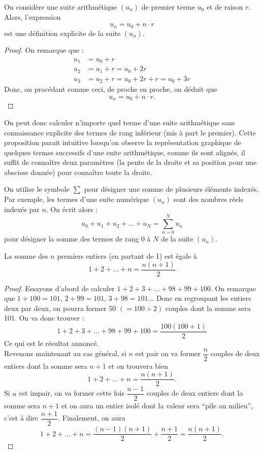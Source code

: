 \documentclass[a4paper, 12pt]{report}
\begin{document}
\begin{thm}
On considère une suite arithmétique $(u_n)$ de premier terme $u_0$ et de raison $r$. Alors, l'expression 
\[ u_n = u_0 + n \cdot r \]
est une définition explicite de la suite $(u_n)$.
\end{thm}

\begin{proof}
On remarque que :
\begin{align*}
u_1 & = u_0 + r \\
u_2 & = u_1 + r = u_0 + 2r  \\
u_3 & = u_2 + r = u_0 + 2r + r = u_0 + 3r 
\end{align*}
Donc, on procédant comme ceci, de proche en proche, on déduit que 
\[ u_n = u_0 + n \cdot r . \]
\end{proof}

\begin{rmq} On peut donc calculer n'importe quel terme d'une suite arithmétique sans connaissance explicite des termes de rang inférieur (mis à part le premier). Cette proposition parait intuitive lorsqu'on observe la représentation graphique de quelques termes successifs d'une suite arithmétique, comme ils sont alignés, il suffit de connaître deux paramètres (la pente de la droite et sa position pour une abscisse donnée) pour connaître toute la droite. 
\end{rmq}

\begin{nota}
On utilise le symbole $\sum$ pour désigner une somme de plusieurs éléments indexés. Par exemple, les termes d'une suite numérique $(u_n)$ sont des nombres réels indexés par $n$. On écrit alors :
\[ u_0 + u_1 + u_2 + \dots + u_N = \sum_{n=0}^N u_n \]
pour désigner la somme des termes de rang 0 à $N$ de la suite $(u_n)$.
\end{nota}

\begin{lem}
La somme des $n$ premiers entiers (en partant de 1) est égale à 
\[ 1+2+ \dots +n = \dfrac{n(n+1)}2 \]
\end{lem}

\begin{proof}
Essayons d'abord de calculer $1+2+3+\dots+98+99+100$. On remarque que $1+100=101$, $2+99=101$, $3+98=101 \dots$ Donc en regroupant les entiers deux par deux, on pourra former 50 $(=100 \div 2)$ couples dont la somme sera 101. On va donc trouver :
\[  1+2+3+\dots+98+99+100 = \dfrac{100(100+1)}2  \]
Ce qui est le résultat annoncé. \\

Revenons maintenant au cas général, si $n$ est pair on va former $\dfrac{n}2$ couples de deux entiers dont la somme sera $n+1$ et on trouvera bien 
\[ 1+2+ \dots +n = \dfrac{n(n+1)}2. \]
Si $n$ est impair, on va former cette fois $\dfrac{n-1}2$ couples de deux entiers dont la somme sera $n+1$ et on aura un entier isolé dont la valeur sera ``pile au milieu'', c'est à dire $\dfrac{n+1}2$. 
Finalement, on aura 
\[ 1+2+ \dots +n = \dfrac{(n-1)(n+1)}2 + \dfrac{n+1}2 = \dfrac{n(n+1)}2. \]
\end{proof}
\end{document}
